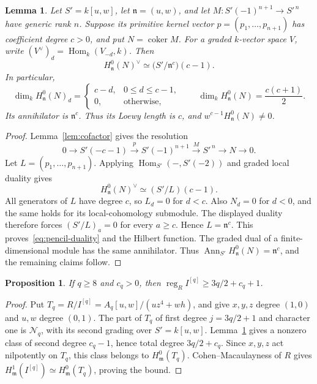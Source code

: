 \documentclass[11pt,a4paper,reqno]{amsart}
\numberwithin{equation}{section}
\theoremstyle{plain}
\newtheorem{lemma}[theorem]{Lemma}
\newtheorem{proposition}[theorem]{Proposition}
\theoremstyle{definition}
\theoremstyle{remark}
\newcommand{\mm}{\mathfrak m}
\DeclareMathOperator{\Ann}{Ann}
\DeclareMathOperator{\coker}{coker}
\DeclareMathOperator{\Hom}{Hom}
\DeclareMathOperator{\reg}{reg}
\begin{document}
\begin{lemma}\label{lem:duality}
Let $S'=k[u,w]$, let $\mathfrak n=(u,w)$, and let
$M:S'(-1)^{n+1}\to S'^{\,n}$ have generic rank $n$.
Suppose its primitive kernel vector $p=(p_1,\ldots,p_{n+1})$ has
coefficient degree $c>0$, and put $N=\coker M$.
For a graded $k$-vector space $V$, write
$(V^\vee)_d=\Hom_k(V_{-d},k)$. Then
\begin{equation}\label{eq:pencil-duality}
H^0_{\mathfrak n}(N)^\vee
\simeq \bigl(S'/\mathfrak n^c\bigr)(c-1).
\end{equation}
In particular,
\[
\dim_k H^0_{\mathfrak n}(N)_d=
\begin{cases}c-d,&0\leq d\leq c-1,\\0,&\text{otherwise},\end{cases}
\qquad
\dim_k H^0_{\mathfrak n}(N)=\frac{c(c+1)}2.
\]
Its annihilator is $\mathfrak n^c$. Thus its Loewy length is $c$, and
$w^{c-1}H^0_{\mathfrak n}(N)\ne0$.
\end{lemma}
\begin{proof}
Lemma~\ref{lem:cofactor} gives the resolution
\[
0\longrightarrow S'(-c-1)\xrightarrow{p}S'(-1)^{n+1}
\xrightarrow{M}S'^{\,n}\longrightarrow N\longrightarrow0.
\]
Let $L=(p_1,\ldots,p_{n+1})$. Applying
$\Hom_{S'}(-,S'(-2))$ and graded local duality gives
\[
H^0_{\mathfrak n}(N)^\vee\simeq(S'/L)(c-1).
\]
All generators of $L$ have degree $c$, so $L_d=0$ for $d<c$.
Also $N_d=0$ for $d<0$, and the same holds for its local-cohomology
submodule. The displayed duality therefore forces
$(S'/L)_a=0$ for every $a\geq c$. Hence $L=\mathfrak n^c$.
This proves~\eqref{eq:pencil-duality} and the Hilbert function.
The graded dual of a finite-dimensional module has the same annihilator.
Thus $\Ann_{S'}H^0_{\mathfrak n}(N)=\mathfrak n^c$, and the remaining
claims follow.
\end{proof}

\begin{proposition}\label{prop:regularity-reduction}
If $q\geq8$ and $c_q>0$, then $\reg_R I^{[q]}\geq3q/2+c_q+1$.
\end{proposition}
\begin{proof}
Put $T_q=R/I^{[q]}=A_q[u,w]/(uz^4+wh)$, and give $x,y,z$ degree $(1,0)$
and $u,w$ degree $(0,1)$. The part of $T_q$ of first degree $j=3q/2+1$ and character one
is $\mathcal N_q$, with its second grading over $S'=k[u,w]$.
Lemma~\ref{lem:duality} gives a nonzero class of second degree $c_q-1$,
hence total degree $3q/2+c_q$. Since $x,y,z$ act nilpotently on $T_q$,
this class belongs to $H^0_\mm(T_q)$. Cohen--Macaulayness of $R$ gives
$H^1_\mm(I^{[q]})\simeq H^0_\mm(T_q)$, proving the bound.
\end{proof}
\end{document}
